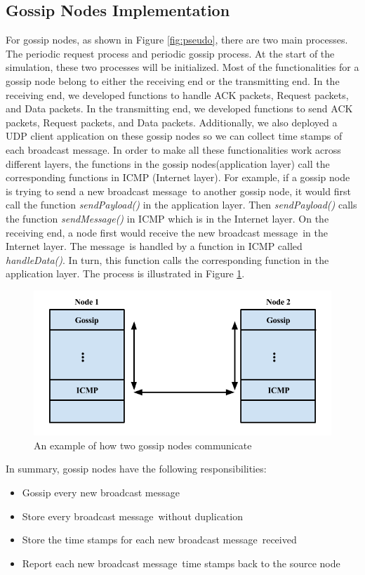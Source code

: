 \documentclass[onehalf,11pt]{beavtex}
\newcommand{\msg}{message}
\newcommand{\gns}{gossip nodes}
\begin{document}
\subsection{Gossip Nodes Implementation}
For gossip nodes, as shown in Figure \ref{fig:pseudo}, there are two main processes. The periodic request process and periodic gossip process. At the start of the simulation, these two processes will be initialized. Most of the functionalities for a gossip node belong to either the receiving end or the transmitting end. In the receiving end, we developed functions to handle ACK packets, Request packets, and Data packets. In the transmitting end, we developed functions to send ACK packets, Request packets, and Data packets. Additionally, we also deployed a UDP client application on these gossip nodes so we can collect time stamps of each broadcast \msg. In order to make all these functionalities work across different layers, the functions in the \gns (application layer) call the corresponding functions in ICMP (Internet layer). For example, if a gossip node is trying to send a new broadcast \msg ~to another gossip node, it would first call the function \emph{sendPayload()} in the application layer. Then \emph{sendPayload()} calls the function \emph{sendMessage()} in ICMP which is in the Internet layer. On the receiving end, a node first would receive the new broadcast \msg ~in the Internet layer. The \msg ~is handled by a function in ICMP called \emph{handleData()}. In turn, this function calls the corresponding function in the application layer. The process is illustrated in Figure \ref{fig:topDown}.

\begin{figure}
	\centering
	\includegraphics[width=5.5in]{topDown.png}
	\caption{An example of how two gossip nodes communicate}
	\label{fig:topDown}
\end{figure}

In summary, gossip nodes have the following responsibilities:
\begin{itemize}
	\item Gossip every new broadcast \msg
	\item Store every broadcast \msg ~without duplication
	\item Store the time stamps for each new broadcast \msg ~received 
	\item Report each new broadcast \msg ~time stamps back to the source node
\end{itemize}
\end{document}
